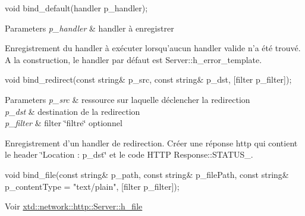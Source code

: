 \begin{DoxyItemize}
\item 
\begin{DoxyCode}
\textcolor{keywordtype}{void} bind\_default(handler p\_handler); 
\end{DoxyCode}
 \par
\par
 
\begin{DoxyParams}{Parameters}
{\em p\-\_\-handler} & handler à enregistrer\\
\hline
\end{DoxyParams}
Enregistrement du handler à exécuter lorsqu'aucun handler valide n'a été trouvé. A la construction, le handler par défaut est Server\-::h\-\_\-error\-\_\-template. \par
\par

\item 
\begin{DoxyCode}
\textcolor{keywordtype}{void} bind\_redirect(\textcolor{keyword}{const} \textcolor{keywordtype}{string}& p\_src, \textcolor{keyword}{const} \textcolor{keywordtype}{string}& p\_dst, [filter p\_filter]); 
\end{DoxyCode}
 \par
\par
 
\begin{DoxyParams}{Parameters}
{\em p\-\_\-src} & ressource sur laquelle déclencher la redirection \\
\hline
{\em p\-\_\-dst} & destination de la redirection \\
\hline
{\em p\-\_\-filter} & filter \char`\"{}filtre\char`\"{} optionnel\\
\hline
\end{DoxyParams}
Enregistrement d'un handler de redirection. Créer une réponse http qui contient le header \char`\"{}\-Location \-: p\-\_\-dst\char`\"{} et le code H\-T\-T\-P Response\-::\-S\-T\-A\-T\-U\-S\-\_. \par
\par

\item 
\begin{DoxyCode}
\textcolor{keywordtype}{void} bind\_file(\textcolor{keyword}{const} \textcolor{keywordtype}{string}& p\_path,
               \textcolor{keyword}{const} \textcolor{keywordtype}{string}& p\_filePath,
               \textcolor{keyword}{const} \textcolor{keywordtype}{string}& p\_contentType = \textcolor{stringliteral}{"text/plain"},
               [filter            p\_filter]);
\end{DoxyCode}
 \par
\par
 Voir \hyperlink{classxtd_1_1network_1_1http_1_1Server_a4358a20d2246a84f67d299f385c5bce8}{xtd\-::network\-::http\-::\-Server\-::h\-\_\-file} \par
\par


\end{DoxyItemize}
